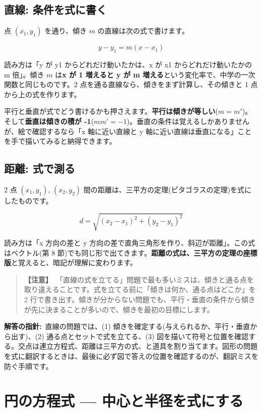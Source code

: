 \documentclass{article}
\begin{document}
\subsection{直線: 条件を式に書く}

点 \( (x_{1}, y_{1}) \) を通り、傾き \( m \) の直線は次の式で書けます。

\[ y - y_{1} = m(x - x_{1}) \]

読み方は「y が y1 からどれだけ動いたかは、x が x1 からどれだけ動いたかの m 倍」。傾き \( m \) は\textbf{x が 1 増えると y が m 増える}という変化率で、中学の一次関数と同じものです。2 点を通る直線なら、傾きをまず計算し、その傾きと 1 点から上の式を作ります。

平行と垂直が式でどう書けるかも押さえます。\textbf{平行は傾きが等しい}(\( m = m' \))。そして\textbf{垂直は傾きの積が -1}(\( mm' = -1 \))。垂直の条件は覚えるしかありませんが、絵で確認するなら「x 軸に近い直線と y 軸に近い直線は垂直になる」ことを手で描いてみると納得できます。

\subsection{距離: 式で測る}

2 点 \( (x_{1}, y_{1}) \), \( (x_{2}, y_{2}) \) 間の距離は、三平方の定理(ピタゴラスの定理)を式にしたものです。

\[ d = \sqrt{(x_{2} - x_{1})^{2} + (y_{2} - y_{1})^{2}} \]

読み方は「x 方向の差と y 方向の差で直角三角形を作り、斜辺が距離」。この式はベクトル(第 8 節)でも同じ形で出てきます。\textbf{距離の式は、三平方の定理の座標版}と覚えると、暗記が理解に変わります。

\begin{quote}
\textbf{【注意】}\ 「直線の式を立てる」問題で最も多いミスは、傾きと通る点を取り違えることです。式を立てる前に「傾きは何か、通る点はどこか」を 2 行で書き出す。傾きが分からない問題でも、平行・垂直の条件から傾きが先に決まることが多いので、傾きを最初の目標にします。
\end{quote}

\textbf{解答の指針:}\ 直線の問題では、(1) 傾きを確定する(与えられるか、平行・垂直から出す)、(2) 通る点とセットで式を立てる、(3) 図を描いて符号と位置を確認する。交点は連立方程式、距離は三平方の式、と道具を割り当てます。図形の問題を式に翻訳するときは、最後に必ず図で答えの位置を確認するのが、翻訳ミスを防ぐ手順です。

\section{円の方程式 — 中心と半径を式にする}
\end{document}
